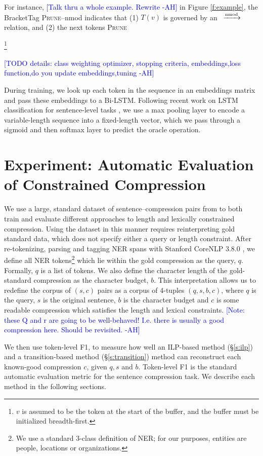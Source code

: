\documentclass[11pt,a4paper]{article}
\newcommand{\rdep}[1]{\ $\xrightarrow{\text{\tiny #1}}$\ }
\newcommand{\ahcomment}[1]{\textcolor{blue}{[#1 -AH]}}
\begin{document}
For instance, \ahcomment{Talk thru a whole example. Rewrite} in Figure \ref{f:example}, the BracketTag \textsc{Prune}--nmod indicates that (1) $T(v)$ is governed by an \rdep{nmod} relation, and (2) the next tokens \textsc{Prune}

\footnote{$v$ is assumed to be the token at the start of the buffer, and the buffer must be initialized breadth-first.}

\ahcomment{TODO details: class weighting optimizer, stopping criteria,  embeddings,loss function,do you update embeddings,tuning}

During training, we look up each token in the sequence in an embeddings matrix and pass these embeddings to a Bi-LSTM. Following recent work on LSTM classification for sentence-level tasks \cite{D17-1070}, we use a max pooling layer to encode a variable-length sequence into a fixed-length vector, which we pass through a sigmoid and then softmax layer to predict the oracle 
operation. 


\section{Experiment: Automatic Evaluation of Constrained Compression}

We use a large, standard dataset of sentence--compression pairs from \citet{filippova2013overcoming} to both train and evaluate different approaches to length and lexically constrained compression. Using the dataset in this manner requires reinterpreting gold standard data, which does not specify either a query or length constraint. After re-tokenizing, parsing and tagging NER spans with Stanford CoreNLP 3.8.0 \cite{corenlp}, we define all NER tokens\footnote{We use a standard 3-class definition of NER; for our purposes, entities are people, locations or organizations.} which lie within the gold compression as the query, $q$. Formally, $q$ is a list of tokens. We also define the character length of the gold-standard compression as the character budget, $b$. This interpretation allows us to redefine the corpus of $(s,c)$ pairs as a corpus of 4-tuples $(q,s,b,c)$, where $q$ is the query, $s$ is the original sentence, $b$ is the character budget and $c$ is some readable compression which satisfies the length and lexical constraints.  \ahcomment{Note: these Q and r are going to be well-behaved! I.e. there is usually a good compression here. Should be revisited.}

We then use token-level F1, to measure how well an ILP-based method (\S\ref{s:ilp}) and a transition-based method (\S\ref{s:transition}) method can reconstruct each known-good compression $c$, given $q,s$ and $b$. Token-level F1 is the standard automatic evaluation metric for the sentence compression task. We describe each method in the following sections.
\end{document}
